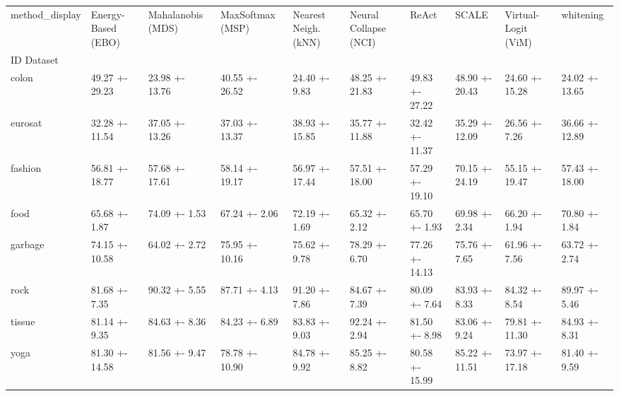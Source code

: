 \begin{tabular}{llllllllll}
\toprule
method_display & Energy-Based (EBO) & Mahalanobis (MDS) & MaxSoftmax (MSP) & Nearest Neigh. (kNN) & Neural Collapse (NCI) & ReAct & SCALE & Virtual-Logit (ViM) & whitening \\
ID Dataset &  &  &  &  &  &  &  &  &  \\
\midrule
colon & 49.27 +- 29.23 & 23.98 +- 13.76 & 40.55 +- 26.52 & 24.40 +- 9.83 & 48.25 +- 21.83 & 49.83 +- 27.22 & 48.90 +- 20.43 & 24.60 +- 15.28 & 24.02 +- 13.65 \\
eurosat & 32.28 +- 11.54 & 37.05 +- 13.26 & 37.03 +- 13.37 & 38.93 +- 15.85 & 35.77 +- 11.88 & 32.42 +- 11.37 & 35.29 +- 12.09 & 26.56 +- 7.26 & 36.66 +- 12.89 \\
fashion & 56.81 +- 18.77 & 57.68 +- 17.61 & 58.14 +- 19.17 & 56.97 +- 17.44 & 57.51 +- 18.00 & 57.29 +- 19.10 & 70.15 +- 24.19 & 55.15 +- 19.47 & 57.43 +- 18.00 \\
food & 65.68 +- 1.87 & 74.09 +- 1.53 & 67.24 +- 2.06 & 72.19 +- 1.69 & 65.32 +- 2.12 & 65.70 +- 1.93 & 69.98 +- 2.34 & 66.20 +- 1.94 & 70.80 +- 1.84 \\
garbage & 74.15 +- 10.58 & 64.02 +- 2.72 & 75.95 +- 10.16 & 75.62 +- 9.78 & 78.29 +- 6.70 & 77.26 +- 14.13 & 75.76 +- 7.65 & 61.96 +- 7.56 & 63.72 +- 2.74 \\
rock & 81.68 +- 7.35 & 90.32 +- 5.55 & 87.71 +- 4.13 & 91.20 +- 7.86 & 84.67 +- 7.39 & 80.09 +- 7.64 & 83.93 +- 8.33 & 84.32 +- 8.54 & 89.97 +- 5.46 \\
tissue & 81.14 +- 9.35 & 84.63 +- 8.36 & 84.23 +- 6.89 & 83.83 +- 9.03 & 92.24 +- 2.94 & 81.50 +- 8.98 & 83.06 +- 9.24 & 79.81 +- 11.30 & 84.93 +- 8.31 \\
yoga & 81.30 +- 14.58 & 81.56 +- 9.47 & 78.78 +- 10.90 & 84.78 +- 9.92 & 85.25 +- 8.82 & 80.58 +- 15.99 & 85.22 +- 11.51 & 73.97 +- 17.18 & 81.40 +- 9.59 \\
\bottomrule
\end{tabular}
